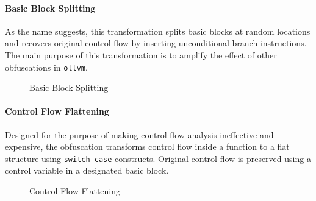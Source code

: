 \paragraph{Basic Block Splitting} As the name suggests, this transformation splits basic blocks at random locations and recovers original control flow by inserting unconditional branch instructions. The main purpose of this transformation is to amplify the effect of other obfuscations in \texttt{ollvm}.

\begin{figure}[H]
    \centering
    \caption{Basic Block Splitting}
    \label{fig_bb_split}
\end{figure}

\paragraph{Control Flow Flattening} Designed for the purpose of making control flow analysis ineffective and expensive, the obfuscation transforms control flow inside a function to a flat structure using \texttt{switch-case} constructs. Original control flow is preserved using a control variable in a designated basic block.

\begin{figure}[H]
    \centering
    \caption{Control Flow Flattening}
    \label{fig_flattening}
\end{figure}

